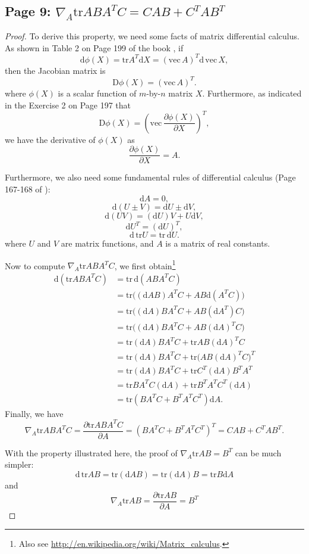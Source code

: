 \documentclass{article}
\begin{document}
\subsection{Page 9: $\nabla_{A}\text{tr}ABA^TC=CAB+C^TAB^T$}
\begin{proof}
To derive this property, we need some facts of matrix differential calculus. As shown in Table 2 on Page 199 of the book \cite{MatrixDiffCalc}, if
\[
\text{d}\phi(X)=\text{tr}A^T\text{d}X=(\text{vec}\,A)^T\text{d}\,\text{vec}\,X,
\]
then the Jacobian matrix is
\[
\text{D}\phi(X)=(\text{vec}\,A)^T.
\]
where $\phi(X)$ is a scalar function of $m$-by-$n$ matrix $X$. Furthermore, as indicated in the Exercise 2 on Page 197 that
\[
\text{D}\phi(X)=\left(\text{vec}\,\frac{\partial{\phi(X)}}{\partial{X}}\right)^T,
\]
we have the derivative of $\phi(X)$ as
\[
\frac{\partial{\phi(X)}}{\partial{X}}=A.
\]

Furthermore, we also need some fundamental rules of differential calculus (Page 167-168 of \cite{MatrixDiffCalc}):
\[
\text{d}A=0,
\]
\[
\text{d}(U\pm V)=\text{d}U\pm\text{d}V,
\]
\[
\text{d}(UV)=(\text{d}U)V+U\text{d}V,
\]
\[
\text{d}U^T=(\text{d}U)^T,
\]
\[
\text{d}\,\text{tr}U=\text{tr}\,\text{d}U.
\]
where $U$ and $V$ are matrix functions, and $A$ is a matrix of real constants.

Now to compute $\nabla_{A}\text{tr}ABA^TC$, we first obtain\footnote{Also see \url{ http://en.wikipedia.org/wiki/Matrix_calculus}.}
\[
\begin{split}
\text{d}(\text{tr}ABA^TC)
&=\text{tr}\,\text{d}(ABA^TC)\\
&=\text{tr}\big((\text{d}AB)A^TC+AB\text{d}(A^TC)\big)\\
&=\text{tr}\big((\text{d}A)BA^TC+AB(\text{d}A^T)C\big)\\
&=\text{tr}\big((\text{d}A)BA^TC+AB(\text{d}A)^TC\big)\\
&=\text{tr}(\text{d}A)BA^TC+\text{tr}AB(\text{d}A)^TC\\
&=\text{tr}(\text{d}A)BA^TC+\text{tr}\big(AB(\text{d}A)^TC\big)^T\\
&=\text{tr}(\text{d}A)BA^TC+\text{tr}C^T(\text{d}A)B^TA^T\\
&=\text{tr}BA^TC(\text{d}A)+\text{tr}B^TA^TC^T(\text{d}A)\\
&=\text{tr}(BA^TC+B^TA^TC^T)\text{d}A.
\end{split}
\]
Finally, we have
\[
\nabla_{A}\text{tr}ABA^TC=\frac{\partial{\text{tr}ABA^TC}}{\partial{A}}=(BA^TC+B^TA^TC^T)^T=CAB+C^TAB^T.
\]

With the property illustrated here, the proof of $\nabla_{A}\text{tr}AB=B^T$ can be much simpler:
\[
\text{d}\,\text{tr}AB=\text{tr}(\text{d}AB)=\text{tr}(\text{d}A)B=\text{tr}B\text{d}A
\]
and
\[
\nabla_{A}\text{tr}AB=\frac{\partial{\text{tr}AB}}{\partial{A}}=B^T
\]

\end{proof}
\end{document}
